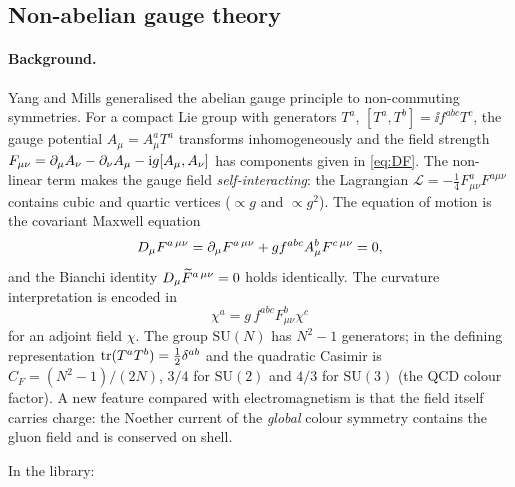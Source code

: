 \subsection{Non-abelian gauge theory}


\paragraph{Background.} Yang and Mills \cite{YangMills1954} generalised the abelian gauge principle to non-commuting symmetries. For a compact Lie group with generators $T^a$, $[T^a,T^b]=\ii f^{abc}T^c$, the gauge potential $A_\mu=A_\mu^aT^a$ transforms inhomogeneously and the field strength $F_{\mu\nu}=\partial_\mu A_\nu-\partial_\nu A_\mu-\mathrm{i} g[A_\mu,A_\nu]$ has components given in \cref{eq:DF}. The non-linear term makes the gauge field \emph{self-interacting}: the Lagrangian $\mathcal L=-\tfrac14F^a_{\mu\nu}F^{a\mu\nu}$ contains cubic and quartic vertices ($\propto g$ and $\propto g^2$). The equation of motion is the covariant Maxwell equation
\begin{equation}
D_\mu F^{a\,\mu\nu}=\partial_\mu F^{a\,\mu\nu}+gf^{abc}A^b_\mu F^{c\,\mu\nu}=0,
\end{equation}
and the Bianchi identity $D_\mu\widetilde{F}^{a\,\mu\nu}=0$ holds identically. The curvature interpretation is encoded in
\begin{equation}
[D_\mu,D_\nu]\chi^a=g\,f^{abc}F^b_{\mu\nu}\chi^c
\label{eq:comm}
\end{equation}
for an adjoint field $\chi$. The group $\mathrm{SU}(N)$ has $N^2-1$ generators; in the defining representation $\operatorname{tr}(T^aT^b)=\tfrac12\delta^{ab}$ and the quadratic Casimir is $C_F=(N^2-1)/(2N)$, $3/4$ for $\mathrm{SU}(2)$ and $4/3$ for $\mathrm{SU}(3)$ (the QCD colour factor). A new feature compared with electromagnetism is that the field itself carries charge: the Noether current of the \emph{global} colour symmetry contains the gluon field and is conserved on shell.

In the library:


